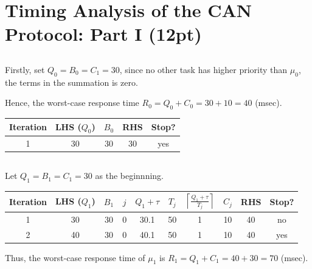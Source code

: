 \documentclass{article}
\title{\mytitle}
\author{\textbf{\myauthor}}
\date{}
\begin{document}
\maketitle

\section{Timing Analysis of the CAN Protocol: Part I (12pt)}
\subsection{}
Firstly, set $Q_0=B_0=C_1=30$, since no other task has higher priority than $\mu_0$, the terms in the summation is zero.

Hence, the worst-case response time $R_0=Q_0+C_0=30+10=40$ (msec).
\begin{table}[h]
    \centering %
    \begin{tabular}{|c||c||c|c|c|} 
        \hline 
        Iteration & LHS ($Q_0$) & $B_0$ & RHS & Stop? \\ [0.5ex] 
        \hline \hline
        1 & 30 & 30 & 30 & yes\\ [1ex] 
        \hline 
    \end{tabular}
\end{table}

\subsection{}
Let $Q_1=B_1=C_1=30$ as the beginnning.
\begin{table}[h]
    \centering
    \renewcommand{\arraystretch}{1.5} 
    
    \begin{tabular}{|c||c||c|c|c|c|c|c|c|c|}
        \hline
        Iteration & LHS ($Q_1$) & $B_1$ & $j$ & $Q_1 + \tau$ & $T_j$ & $\left\lceil \frac{Q_1 + \tau}{T_j} \right\rceil$ & $C_j$ & RHS & Stop? \\ 
        \hline \hline
        1 & 30 & 30 & 0 & 30.1 & 50 & 1 & 10 & 40 & no \\ 
        \hline
        2 & 40 & 30 & 0 & 40.1 & 50 & 1 & 10 & 40 & yes \\ 
        \hline
    \end{tabular}
\end{table}

Thus, the worst-case response time of $\mu_1$ is $R_1=Q_1+C_1=40+30=70$ (msec).
\end{document}
